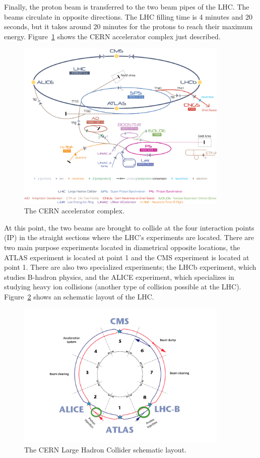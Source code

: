 Finally, the proton beam is transferred to the two beam pipes of the
LHC. The beams circulate in opposite directions. The LHC filling time
is 4 minutes and 20 seconds, but it takes around 20 minutes for the
protons to reach their maximum energy. Figure~\ref{fig:cernAcc} shows
the CERN accelerator complex just described.
\begin{figure}
 \centering
 \includegraphics[width=0.9\textwidth]{LHC_fig/Cern-Accelerator-Complex.jpg}
 \caption{The CERN accelerator complex.\label{fig:cernAcc} }
\end{figure}
At this point, the two beams are brought to collide at the four interaction points (IP) in the straight
sections where the LHC's experiments are located. There are two main
purpose experiments located in diametrical opposite locations, the
ATLAS experiment is located at point 1 and the CMS experiment is
located at point 1. There are also two specialized experiments; the
LHCb experiment, which studies B-hadron physics, and the ALICE
experiment, which specializes in studying heavy ion collisions (another type of
collision possible at the LHC). Figure~\ref{fig:LHC} shows an
schematic layout of the LHC.
\begin{figure}
 \centering
 \includegraphics[width=0.9\textwidth]{LHC_fig/LHC_layout.png}
 \caption{The CERN Large Hadron Collider schematic layout.\label{fig:LHC} }
\end{figure}
